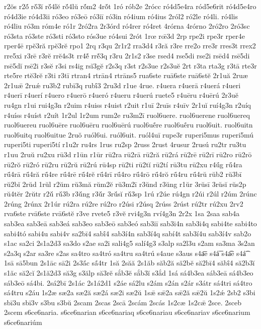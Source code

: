 {r2ŏs
r2ŏ́
rŏ́3ĭ
rŏ́4lĕ
rŏ́4lŭ
rŏ́m2
4rŏ́t
1ró
rób2e
2rócc
ró4d5e4ra
ród5e6rit
ró4d5e4ro
ró4d3ie
ró4d3ii
ró3eo
ró3eō
ró3iī
ró3in
ró4ium
ró4ius
2ról2
ró2le
ró4li.
ró4lis
ró4liu
ró3m
róm4e
ró1r
2ró2ra
2r3órd
ró4rer
ró4ret
4rórna
4rórno
2ró2ro
2ró3sc
ró3sta
ró3ste
ró3sti
ró3sto
rós3ue
ró4sui
2rót
1rœ
rœ̄3d
2rp
rpe2i
rpe3r
rper4e
rper4ē
rpĕ3ră
rpĕ3rĕ
rpo1
2rq
r3qu
2r1r2
rra3d4
r3ră
r3re
rre2o
rre3r
rres3t
rrex2
rre5xi
r3rē
r3rĕ
rrĕ4s3t
rr4ĕ́
rrĕ́3q
r3ru
2r1s2
r3se
rsed4
rse5di
rse2i
rsēd4
rsē5di
rsē5dĭ
rsē2i
r3sĕ
r3si
rs4ig
rsĭ3gĕ
r2s3q
r3st
r2s3ue
r2s3uĕ
2rt
r3ta
rta3g
r3tā
rte3r
rte5re
rtĕ3rĕ
r3ti
r3tī
rtran4
rtrān4
rtrāns5
rua6ste
ruā6ste
ruā6stĕ
2r1uă
2ruæ
2r1uǣ
2ruǽ
ru3b2
rubī3q
rubī́3
2ru3d
r1ue
4rue.
r4uera
r4uerā
r4uerá
r4ueri
r4uerī
r4uerí
r4uero
r4uerō
r4ueró
r4ueru
r4uerú
ruete5
r4uēru
r4uērú
2r3uĕ
ru4gn
r1ui
rui4g3n
r2uim
r4uiss
r4uist
r2uit
r1uī
2ruīs
r4uīv
2r1uĭ
ruí4g3n
r2uíq
r4uíss
r4uíst
r2uít
1r2ul
1r2um
rum2e
ru3m2ī
ruol6uere.
ruol6uerene
ruol6uereq
ruol6uereu
ruol6uēre
ruol6uēru
ruol6uērú
ruol6uḗre
ruol6uḗru
ruol6uit.
ruol6uitn
ruol6uitq
ruol6uitue
2ruŏ
ruól6ui.
ruól6uit.
ruól4uī
rupe3r
ruperi5mus
ruperi5mú
ruperi5ti
ruperi5tí
r1u2r
ru4rs
1rus
ru2sp
2russ
2rust
4rusur
2rusú
ru2tr
ru3tu
r1uu
2ruŭ
ru2xu
rū3d
r1ūn
r1ūr
rū2ra
rū2rā
rū2ră
rū2rá
rū2rē
rū2rī
rū2ro
rū2rō
rū2rŏ
rū2ró
rū2ru
rū2rŭ
rū2rú
rū4sp
rū2ti
rū2tĭ
rū2tí
rū3tu
rū2xu
r4ū́g
rū́4ra
rū́4rā
rū́4ră
rū́4re
rū́4rē
rū́4rĕ
rū́4rī
rū́4ro
rū́4rō
rū́4rŏ
rū́4ru
rū́4rŭ
rŭb2
rŭ3bī
rŭ2bĭ
2rŭd
1rŭl
r2ŭm
rŭ3mă
rŭm2ĕ
rŭ3m2ī
r3ŭnd
r3ŭng
r1ŭr
3rŭsī
3rŭsĭ
rŭs2p
rŭ4tĕr
2rŭtr
r2ŭ́
rŭ́3b
r3ŭ́ng
r3ŭ́r
3rŭ́sĭ
rŭ́3sp
1rú
r2úe
rú4gn
r2úi
r2úl
r2úm
2rúnc
2rúng
2rúnx
2r1úr
rú2ra
rú2re
rú2ro
r2úsi
r2úsq
2rúss
2rúst
rú2tr
rú2xu
2rv2
rva6ste
rvā6ste
rvā6stĕ
r3ve
rvete5
r3vĕ
rvi4g3n
rví4g3n
2r2x
1sa
2saa
sab4a
sab3ea
sab3eā
sab3eá
sab3eo
sab3eō
sab3eó
sab3iī
sab3i4n
sab3i4q
sabi4te
sabi4to
sabi4tó
sabi4u
sabi4v
sa2bī4
sabī́4
sab3í4n
sab3í4q
sabí4t
sab3í4u
sab3í4v
sab2o
s1ac
sa2ci
2s1a2d3
sa3do
s2ae
sa2i
sali4g5
salí4g3
s3alp
sa2l3u
s2am
sa3ma
3s2an
s2a3q
s2ar
sa3re
s2as
sa4tro
sa4tró
sa4tru
sa4trú
s4aue
s3aus
s4a͞e
s4á͞
s4a͡e
s4á͡
1sā
sā5bun
2s1āc
sā2i
2s3ā́c
sā́4tr
1să
2săă
2s1ăb
săb2ă
să2bĕ
să2bī4
săbī́4
să2b3ĭ
s1ăc
să2cĭ
2s1ă2d3
să3g
s3ălp
să3rĕ
sắb3ĕ
sắb3ĭ
s3ắd
1sá
sá4b3ea
sáb3eā
sá4b3eo
sáb3eō
sá4bi.
2sá2bī
2s1ác
2s1á2d1
s2áe
sá2lu
s2ám
s2án
s2ár
s3átr
sá4tri
sá4tro
sá4tru
s2áu
1s2æ
sæ2a
sæ2ă
sæ2á
sæ2i
sæ2ŭ
1sǣ
sǣ2a
sǣ2ă
sǣ2ŭ
1s2ǽ
2sb2
s3bi
sbī3u
sbī3v
s3bu
s3bŭ
2scam
2scas
2scā
2scám
2scás
1s2cæ
1s2cǣ
2sce.
2sceb
2scem
s6ce6naria.
s6ce6narian
s6ce6nariaq
s6ce6nariau
s6ce6nariav
s6ce6narium
s6ce6nariúm
}
